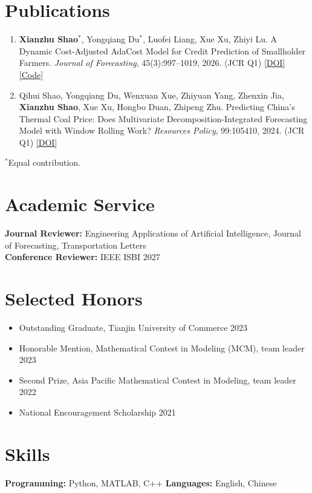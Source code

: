 \documentclass[10pt]{article}
\begin{document}
\section{Publications}
\begin{enumerate}[leftmargin=1.5em,itemsep=4pt,topsep=2pt]
  \item \textbf{Xianzhu Shao}$^*$, Yongqiang Du$^*$, Luofei Liang, Xue Xu, Zhiyi Lu.
  A Dynamic Cost-Adjusted AdaCost Model for Credit Prediction of Smallholder Farmers.
  \textit{Journal of Forecasting}, 45(3):997--1019, 2026. (JCR Q1)
  \href{https://doi.org/10.1002/for.70069}{[DOI]}
  \href{https://github.com/xianzhushao/Adjust-Adacost}{[Code]}
  \item Qihui Shao, Yongqiang Du, Wenxuan Xue, Zhiyuan Yang, Zhenxin Jia, \textbf{Xianzhu Shao}, Xue Xu, Hongbo Duan, Zhipeng Zhu.
  Predicting China's Thermal Coal Price: Does Multivariate Decomposition-Integrated Forecasting Model with Window Rolling Work?
  \textit{Resources Policy}, 99:105410, 2024. (JCR Q1)
  \href{https://doi.org/10.1016/j.resourpol.2024.105410}{[DOI]}
\end{enumerate}
{\small $^*$Equal contribution.}

\section{Academic Service}
\textbf{Journal Reviewer:} Engineering Applications of Artificial Intelligence, Journal of Forecasting, Transportation Letters\\
\textbf{Conference Reviewer:} IEEE ISBI 2027

\section{Selected Honors}
\begin{itemize}
  \item Outstanding Graduate, Tianjin University of Commerce \hfill 2023
  \item Honorable Mention, Mathematical Contest in Modeling (MCM), team leader \hfill 2023
  \item Second Prize, Asia Pacific Mathematical Contest in Modeling, team leader \hfill 2022
  \item National Encouragement Scholarship \hfill 2021
\end{itemize}

\section{Skills}
\textbf{Programming:} Python, MATLAB, C++ \qquad \textbf{Languages:} English, Chinese
\end{document}
